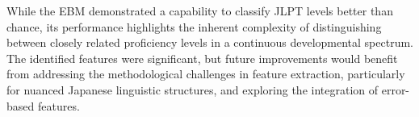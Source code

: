 While the EBM demonstrated a capability to classify JLPT levels better than chance, its performance highlights the
inherent
complexity of distinguishing between closely related proficiency levels in a continuous developmental spectrum. The
identified features were significant, but future improvements would benefit from addressing the methodological
challenges in feature extraction, particularly for nuanced Japanese linguistic structures, and exploring the
integration of error-based features.